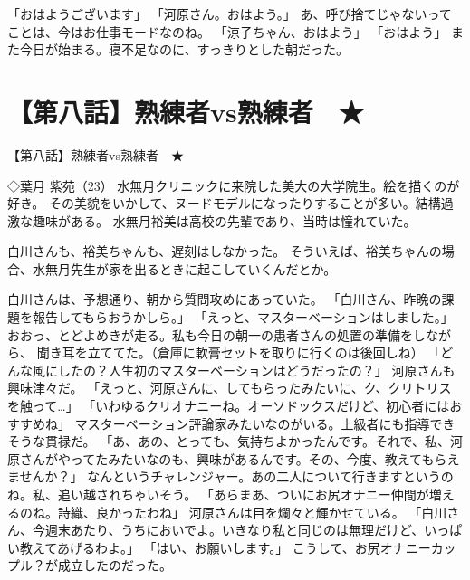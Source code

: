「おはようございます」
「河原さん。おはよう。」
あ、呼び捨てじゃないってことは、今はお仕事モードなのね。
「涼子ちゃん、おはよう」
「おはよう」
また今日が始まる。寝不足なのに、すっきりとした朝だった。


\section{【第八話】熟練者vs熟練者　★}
【第八話】熟練者vs熟練者　★

◇葉月 紫苑（23）
水無月クリニックに来院した美大の大学院生。絵を描くのが好き。
その美貌をいかして、ヌードモデルになったりすることが多い。結構過激な趣味がある。
水無月裕美は高校の先輩であり、当時は憧れていた。

白川さんも、裕美ちゃんも、遅刻はしなかった。
そういえば、裕美ちゃんの場合、水無月先生が家を出るときに起こしていくんだとか。

白川さんは、予想通り、朝から質問攻めにあっていた。
「白川さん、昨晩の課題を報告してもらおうかしら。」
「えっと、マスターベーションはしました。」
おおっ、とどよめきが走る。私も今日の朝一の患者さんの処置の準備をしながら、
聞き耳を立ててた。（倉庫に軟膏セットを取りに行くのは後回しね）
「どんな風にしたの？人生初のマスターベーションはどうだったの？」
河原さんも興味津々だ。
「えっと、河原さんに、してもらったみたいに、ク、クリトリスを触って…」
「いわゆるクリオナニーね。オーソドックスだけど、初心者にはおすすめね」
マスターベーション評論家みたいなのがいる。上級者にも指導できそうな貫禄だ。
「あ、あの、とっても、気持ちよかったんです。それで、私、河原さんがやってたみたいなのも、興味があるんです。その、今度、教えてもらえませんか？」
なんというチャレンジャー。あの二人について行きますというのね。私、追い越されちゃいそう。
「あらまあ、ついにお尻オナニー仲間が増えるのね。詩織、良かったわね」
河原さんは目を爛々と輝かせている。
「白川さん、今週末あたり、うちにおいでよ。いきなり私と同じのは無理だけど、いっぱい教えてあげるわよ。」
「はい、お願いします。」
こうして、お尻オナニーカップル？が成立したのだった。

